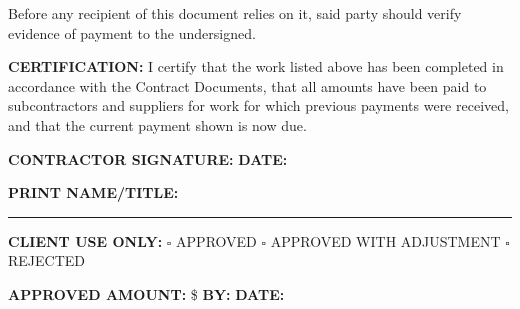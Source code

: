 \documentclass[10pt,letterpaper]{article}
\begin{document}
Before any recipient of this document relies on it, said party should verify evidence of payment to the undersigned.

\vspace{2em}

\noindent\textbf{CERTIFICATION:}
I certify that the work listed above has been completed in accordance with the Contract Documents, that all amounts have been paid to subcontractors and suppliers for work for which previous payments were received, and that the current payment shown is now due.

\vspace{2em}

\noindent\textbf{CONTRACTOR SIGNATURE:} \underline{\hspace{7cm}} \hspace{1cm} \textbf{DATE:} \underline{\hspace{3cm}}

\noindent\textbf{PRINT NAME/TITLE:} \underline{\hspace{7cm}}

\vspace{1em}
\noindent\rule{\textwidth}{0.4pt}
\noindent\textbf{CLIENT USE ONLY:} \hspace{1cm} $\square$ APPROVED \hspace{1cm} $\square$ APPROVED WITH ADJUSTMENT \hspace{1cm} $\square$ REJECTED

\noindent\textbf{APPROVED AMOUNT:} \$ \underline{\hspace{3cm}} \hspace{1cm} \textbf{BY:} \underline{\hspace{4cm}} \hspace{1cm} \textbf{DATE:} \underline{\hspace{3cm}}
\end{document}
